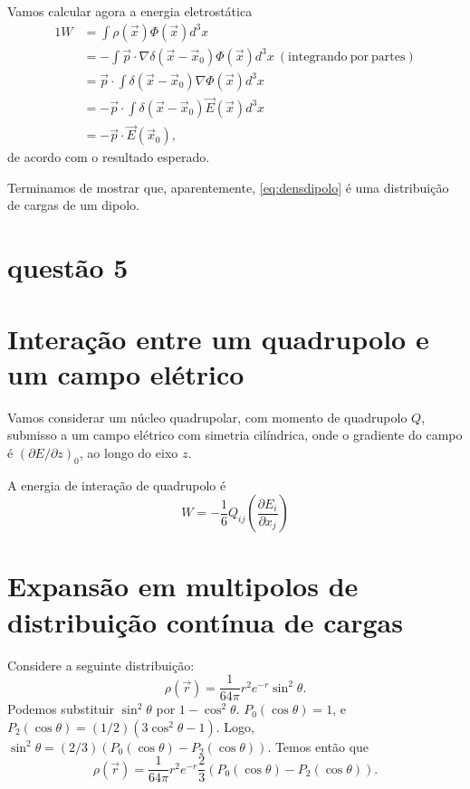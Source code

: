 \documentclass{article}
\begin{document}
Vamos calcular agora a energia eletrostática
\begin{alignat}{1}
 W &= \int \rho(\vec{x})\Phi(\vec{x})d^3x\\ \nonumber
 &= -\int \vec{p}\cdot\nabla\delta(\vec{x}-\vec{x}_0)\Phi(\vec{x})d^3x\ \mathrm{(integrando\ por\ partes)}\\ \nonumber
 &= \vec{p}\cdot \int \delta(\vec{x}-\vec{x}_0)\nabla\Phi(\vec{x})d^3x\\ \nonumber
 &= - \vec{p}\cdot \int \delta(\vec{x}-\vec{x}_0)\vec{E}(\vec{x})d^3x\\
 &= - \vec{p}\cdot \vec{E}(\vec{x}_0)\mathrm{,}
\end{alignat}
de acordo com o resultado esperado.

Terminamos de mostrar que, aparentemente, \eqref{eq:densdipolo} é uma distribuição de cargas de um dipolo.

\section{questão 5}
\section{Interação entre um quadrupolo e um campo elétrico}
Vamos considerar um núcleo quadrupolar, com momento de quadrupolo $Q$, submisso a um campo elétrico com simetria cilíndrica, onde o gradiente do campo é
$(\partial E \slash \partial z )_{0}$, ao longo do eixo $z$.

A energia de interação de quadrupolo é
\begin{equation}
 W = - \frac{1}{6}Q_{ij}\left( \frac{\partial E_i}{\partial x_j} \right)
\end{equation}

\section{Expansão em multipolos de distribuição contínua de cargas}
Considere a seguinte distribuição:
\begin{equation}
 \rho(\vec{r}) = \frac{1}{64\pi}r^2 e^{-r}\sin^2{\theta}\mathrm{.}
\end{equation}
Podemos substituir $\sin^2{\theta}$ por $1-\cos^2{\theta}$. $P_0(\cos{\theta}) = 1$, e $P_2(\cos{\theta}) = (1 \slash 2)(3\cos^2{\theta} - 1)$. Logo,
$\sin^2{\theta} = (2\slash 3)(P_0(\cos{\theta}) - P_2(\cos{\theta}))$. Temos então que
\begin{equation}
 \rho(\vec{r}) = \frac{1}{64\pi}r^2 e^{-r}\frac{2}{3}\left( P_0(\cos{\theta}) - P_2(\cos{\theta}) \right)\mathrm{.}
\end{equation}
\end{document}
